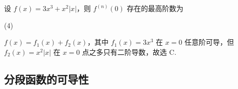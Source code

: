 \begin{example}[1992 数一]
    设 $f(x)=3x^{3}+x^2|x|$，则 $f^{(n)}(0)$ 存在的最高阶数为
    \begin{tasks}(4)
    \end{tasks}
\end{example}
\begin{solution}
    $f(x)=f_1(x)+f_2(x)$，其中 $f_1(x)=3x^3$ 在 $x=0$ 任意阶可导，但 $f_2(x)=x^2|x|$ 在 $x=0$ 点之多只有二阶导数，故选 C.
\end{solution}

\subsection{分段函数的可导性}

% 

